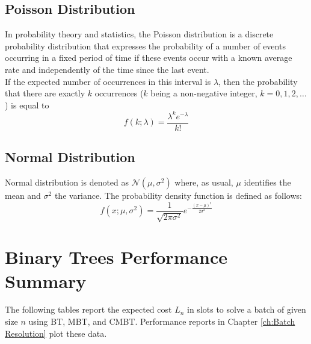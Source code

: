 \begin{appendices}
\subsection*{Poisson Distribution}
In probability theory and statistics, the Poisson distribution is a discrete probability distribution that expresses the probability of a number of events occurring in a fixed period of time if these events occur with a known average rate and independently of the time since the last event.\\ If the expected number of occurrences in this interval is $\lambda$, then the probability that there are exactly $k$ occurrences ($k$ being a non-negative integer, $k = 0, 1, 2, \ldots$) is equal to
\begin{equation}
f(k;\lambda)= \frac{\lambda^{k}e^{-\lambda}}{k!}
\end{equation}


\subsection*{Normal Distribution}

 Normal distribution is denoted as $\mathcal{N}(\mu,\sigma^{2})$ where, as usual, $\mu$ identifies the mean and $\sigma^{2}$ the variance. The probability density function is defined as follows:
\begin{equation}
f(x;\mu,\sigma^{2})= \frac{1}{\sqrt{2\pi\sigma^{2}}}e^{\displaystyle{-\frac{(x-\mu)^{2}}{2\sigma^{2}}}}
\end{equation}

\section{Binary Trees Performance Summary}
The following tables report the expected cost $L_{n}$ in slots to solve a batch of given size $n$ using BT, MBT, and CMBT. Performance reports in Chapter \ref{ch:Batch Resolution} plot these data.
\begin{table}[H]
\caption{\emph{Basic Binary Tree}: Performance report}
\begin{center}
\end{center}
\end{table}


\end{appendices}
